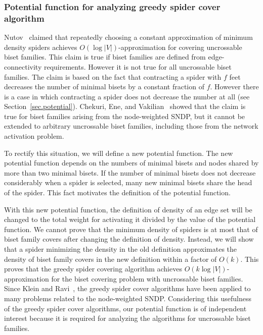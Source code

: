 \documentclass[11pt]{article}
\begin{document}
\subsubsection*{Potential function for analyzing greedy spider cover algorithm}
Nutov~\cite{Nutov12uncrossable} claimed that
repeatedly choosing a constant approximation of minimum density spiders
achieves 
$O(\log |V|)$-approximation for covering uncrossable biset families.
This claim is true if biset families are defined from
edge-connectivity requirements.
However it is not true for all uncrossable biset families.
The claim is based on the fact that contracting a spider with $f$ feet
decreases the number of minimal bisets by a constant fraction of $f$.
However there is a case in which contracting a spider does not decrease
the number at all (see Section~\ref{sec.potential}).
Chekuri, Ene, and Vakilian~\cite{Vakilian13}
showed that the claim is true for biset families arising from the
node-weighted SNDP,
but it cannot be extended to arbitrary uncrossable biset families,
including those from the network activation problem.

To rectify this situation,
we will define a new potential function.
The new potential function depends on
the numbers of minimal bisets and
 nodes shared by more
than two minimal bisets.
If the number of minimal bisets does not decrease considerably when a
spider is selected, 
many new minimal bisets share the head of the spider.
This fact motivates the definition of the potential function.

With this new potential function,
the definition of density of an edge set will be changed to the total weight for
activating it divided by the value of the potential function.
We cannot prove that the minimum density of spiders is at most that of
biset family covers after changing the definition of density.
Instead, we will show that a spider minimizing the density in the old definition
approximates 
the density of biset family covers in the new definition within a factor of $O(k)$.
This proves that the greedy spider covering algorithm achieves
 $O(k\log |V|)$-approximation for the biset
covering problem with uncrossable biset families.
Since Klein and Ravi~\cite{KleinR95},
the greedy spider cover algorithms have been applied to many problems
related to the node-weighted SNDP.
Considering this usefulness of the greedy spider cover algorithms,
our potential function is of independent interest
because it is required for analyzing the algorithms for
uncrossable biset families.
\end{document}
